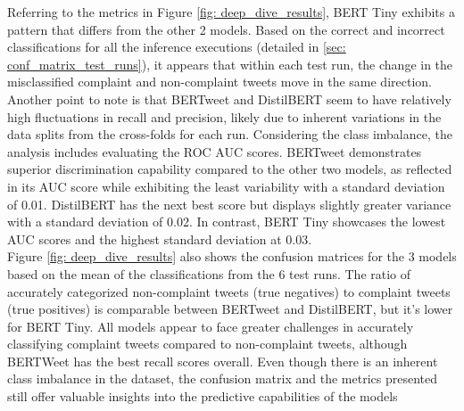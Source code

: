 Referring to the metrics in Figure \ref{fig: deep_dive_results}, BERT Tiny exhibits a pattern that differs from the other 2 models. Based on the correct and incorrect classifications for all the inference executions (detailed in \ref{sec: conf_matrix_test_runs}), it appears that within each test run, the change in the misclassified complaint and non-complaint tweets move in the same direction. Another point to note is that BERTweet and DistilBERT seem to have relatively high fluctuations in recall and precision, likely due to inherent variations in the data splits from the cross-folds for each run. Considering the class imbalance, the analysis includes evaluating the ROC AUC scores. BERTweet demonstrates superior discrimination capability compared to the other two models, as reflected in its AUC score while exhibiting the least variability with a standard deviation of 0.01. DistilBERT has the next best score but displays slightly greater variance with a standard deviation of 0.02. In contrast, BERT Tiny showcases the lowest AUC scores and the highest standard deviation at 0.03.\\

Figure \ref{fig: deep_dive_results} also shows the confusion matrices for the 3 models based on the mean of the classifications from the 6 test runs. The ratio of accurately categorized non-complaint tweets (true negatives) to complaint tweets (true positives) is comparable between BERTweet and DistilBERT, but it's lower for BERT Tiny. All models appear to face greater challenges in accurately classifying complaint tweets compared to non-complaint tweets, although BERTWeet has the best recall scores overall. Even though there is an inherent class imbalance in the dataset, the confusion matrix and the metrics presented still offer valuable insights into the predictive capabilities of the models\\

